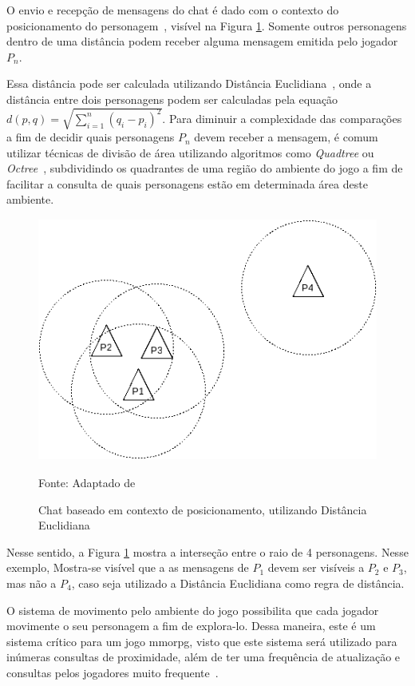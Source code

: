 O envio e recepção de mensagens do chat é dado com o contexto do posicionamento do personagem~\cite{albion_online_unite}, visível na Figura \ref{fig:chat}.
%
Somente outros personagens dentro de uma distância podem receber alguma mensagem emitida pelo jogador $P_n$.



Essa distância pode ser calculada utilizando Distância Euclidiana~\cite{Deza2009Aug}, onde a distância entre dois personagens podem ser calculadas pela equação $d(p, q) = \sqrt{\sum_{i=1}^{n}(q_i - p_i)^2}$.
%
Para diminuir a complexidade das comparações a fim de decidir quais personagens $P_n$ devem receber a mensagem, é comum utilizar técnicas de divisão de área utilizando algoritmos como \textit{Quadtree} ou \textit{Octree}~\cite{Lengyel2011Jun}, subdividindo os quadrantes de uma região do ambiente do jogo a fim de facilitar a consulta de quais personagens estão em determinada área deste ambiente.


\begin{figure}[htb!]
\caption{Chat baseado em contexto de posicionamento, utilizando Distância Euclidiana}
\label{fig:chat}
\includegraphics[height=8cm]{img/cap2/chat.png}
\centering

Fonte: Adaptado de ~\cite{albion_online_unite}
\end{figure}



Nesse sentido, a Figura \ref{fig:chat} mostra a interseção entre o raio de 4 personagens. Nesse exemplo, Mostra-se visível que a as mensagens de $P_1$ devem ser visíveis a $P_2$ e $P_3$, mas não a $P_4$, caso seja utilizado a Distância Euclidiana como regra de distância.



O sistema de movimento pelo ambiente do jogo possibilita que cada jogador movimente o seu personagem a fim de explora-lo.
%
Dessa maneira, este é um sistema crítico para um jogo \ac{mmorpg}, visto que este sistema será utilizado para inúmeras consultas de proximidade, além de ter uma frequência de atualização e consultas pelos jogadores muito frequente~\cite{albion_online_unite}.


